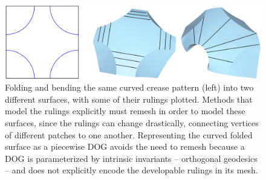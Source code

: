 
\begin{figure} [t]
	\centering
	\includegraphics[width=\linewidth]{figures/rulings_problem_curve}
	\caption{Folding and bending the same curved crease pattern (left) into two different surfaces, with some of their rulings plotted. Methods that model the rulings explicitly must remesh in order to model these surfaces, since the rulings can change drastically, connecting vertices of different patches to one another. Representing the curved folded surface as a piecewise DOG avoids the need to remesh because a DOG is parameterized by intrinsic invariants -- orthogonal geodesics -- and does not explicitly encode the developable rulings in its mesh.}
	\label{fig:rulings_problem_curve}
\end{figure}

